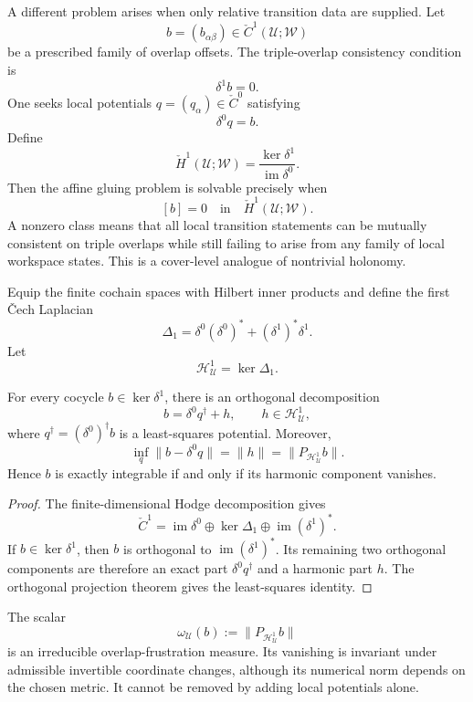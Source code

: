 
A different problem arises when only relative transition data are supplied.
Let
\[
b=(b_{\alpha\beta})\in\check C^1(\mathcal U;\mathscr W)
\]
be a prescribed family of overlap offsets. The triple-overlap consistency
condition is
\[
\delta^1b=0.
\]
One seeks local potentials \(q=(q_\alpha)\in\check C^0\) satisfying
\[
\delta^0q=b.
\]
Define
\[
\boxed{
\check H^1(\mathcal U;\mathscr W)
=
\frac{\ker\delta^1}{\operatorname{im}\delta^0}.
}
\]
Then the affine gluing problem is solvable precisely when
\[
\boxed{[b]=0\quad\text{in}\quad\check H^1(\mathcal U;\mathscr W).}
\]
A nonzero class means that all local transition statements can be mutually
consistent on triple overlaps while still failing to arise from any family of
local workspace states. This is a cover-level analogue of nontrivial holonomy.


Equip the finite cochain spaces with Hilbert inner products and define the
first \v{C}ech Laplacian
\[
\boxed{
\Delta_1
=
\delta^0(\delta^0)^*
+
(\delta^1)^*\delta^1.
}
\]
Let
\[
\mathcal H^1_{\mathcal U}=\ker\Delta_1.
\]

\begin{SRWTproposition}\label{SRWT:prop:harmonic-gluing-obstruction}
For every cocycle \(b\in\ker\delta^1\), there is an orthogonal decomposition
\[
\boxed{
b=\delta^0q^\dagger+h,
\qquad
h\in\mathcal H^1_{\mathcal U},
}
\]
where \(q^\dagger=(\delta^0)^\dagger b\) is a least-squares potential. Moreover,
\[
\boxed{
\inf_q\|b-\delta^0q\|
=
\|h\|
=
\|P_{\mathcal H^1_{\mathcal U}}b\|.
}
\]
Hence \(b\) is exactly integrable if and only if its harmonic component
vanishes.
\end{SRWTproposition}

\begin{proof}
The finite-dimensional Hodge decomposition gives
\[
\check C^1
=
\operatorname{im}\delta^0
\oplus
\ker\Delta_1
\oplus
\operatorname{im}(\delta^1)^*.
\]
If \(b\in\ker\delta^1\), then \(b\) is orthogonal to
\(\operatorname{im}(\delta^1)^*\). Its remaining two orthogonal components are
therefore an exact part \(\delta^0q^\dagger\) and a harmonic part \(h\). The
orthogonal projection theorem gives the least-squares identity.
\end{proof}

The scalar
\[
\omega_{\mathcal U}(b)
:=
\|P_{\mathcal H^1_{\mathcal U}}b\|
\]
is an irreducible overlap-frustration measure. Its vanishing is
invariant under admissible invertible coordinate changes, although its numerical
norm depends on the chosen metric. It cannot be removed by adding local
potentials alone.

